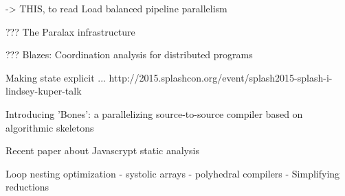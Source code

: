 -> THIS, to read
Load balanced pipeline parallelism \cite{Kamruzzaman2013}


??? The Paralax infrastructure \cite{Vandierendonck2010a}

??? Blazes: Coordination analysis for distributed programs \cite{Alvaro2014}

Making state explicit ... \cite{Fernandez2014a}
http://2015.splashcon.org/event/splash2015-splash-i-lindsey-kuper-talk


Introducing 'Bones': a parallelizing source-to-source compiler based on algorithmic skeletons \cite{Nugteren2012}


Recent paper about Javascrypt static analysis \cite{Chudnov2015}



Loop nesting optimization
- systolic arrays
- polyhedral compilers
- Simplifying reductions 


\cite{Mendis2015}